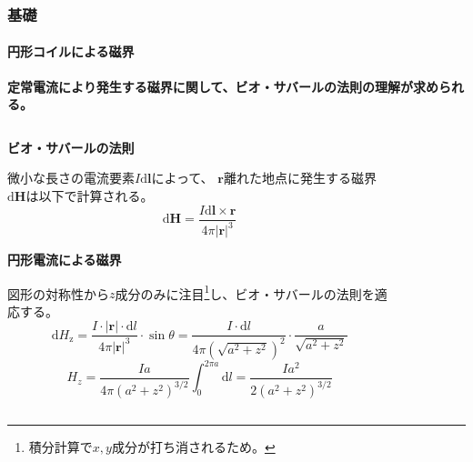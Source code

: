 \documentclass[dvipdfmx, 8pt, aspectratio=169]{beamer}
\begin{document}
\begin{frame}[t]
  \frametitle{基礎}
  \framesubtitle{円形コイルによる磁界}

  \textcolor{mri-blue}{
  \textbf{定常電流により発生する磁界に関して、ビオ・サバールの法則の理解が求められる。
  \vspace{1zh}
  }
  }

  \begin{columns}[t]
    \begin{column}{0.55\textwidth}
      \textbf{ビオ・サバールの法則}
      \vspace{1ex}

      微小な長さの電流要素$I\mathrm{d}\bm{l}$によって、
      $\bm{r}$離れた地点に発生する磁界$\mathrm{d}\bm{H}$は以下で計算される。
      \begin{equation}
        \mathrm{d}\bm{H} = \frac{I\mathrm{d}\bm{l} \times \bm{r}}{4\pi \lvert \bm{r} \rvert^{3}}
      \end{equation}

      \vspace{1zh}

      \textbf{円形電流による磁界}
      \vspace{1ex}

      図形の対称性から$z$成分のみに注目\footnote{積分計算で$x, y$成分が打ち消されるため。}し、ビオ・サバールの法則を適応する。
      \begin{equation}
          \mathrm{d} H_{\mathrm{z}}
          = \frac{I \cdot \lvert \bm{r} \rvert \cdot \mathrm{d}l}{4\pi \lvert \bm{r} \rvert^{3}} \cdot \sin\theta
          = \frac{I \cdot  \mathrm{d}l}{4\pi (\sqrt{a^{2} + z^{2}})^{2}} \cdot \frac{a}{\sqrt{a^{2} + z^{2}}} 
      \end{equation}
      \begin{equation}
        H_{z} = \frac{ Ia }{4\pi (a^{2} + z^{2})^{3/2}}  \int_{0}^{2\pi a} \mathrm{d}l = \frac{Ia^{2}}{2(a^{2} + z^{2})^{3/2}} 
      \end{equation}


    \end{column}

    \begin{column}{0.4\textwidth}

      \begin{figure}
      \begin{center}
\end{center}
\end{figure}
\end{column}
\end{columns}
\end{frame}
\end{document}
